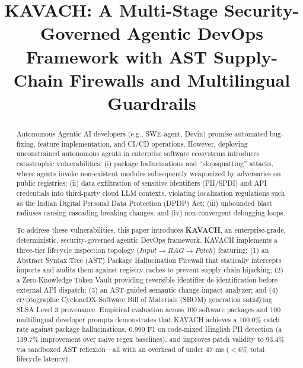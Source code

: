 \documentclass[conference]{IEEEtran}
\begin{document}
\title{KAVACH: A Multi-Stage Security-Governed Agentic DevOps Framework with AST Supply-Chain Firewalls and Multilingual Guardrails}

\author{
}

\maketitle

\begin{abstract}
Autonomous Agentic AI developers (e.g., SWE-agent, Devin) promise automated bug-fixing, feature implementation, and CI/CD operations. However, deploying unconstrained autonomous agents in enterprise software ecosystems introduces catastrophic vulnerabilities: (i) package hallucinations and ``slopsquatting'' attacks, where agents invoke non-existent modules subsequently weaponized by adversaries on public registries; (ii) data exfiltration of sensitive identifiers (PII/SPDI) and API credentials into third-party cloud LLM contexts, violating localization regulations such as the Indian Digital Personal Data Protection (DPDP) Act; (iii) unbounded blast radiuses causing cascading breaking changes; and (iv) non-convergent debugging loops.

To address these vulnerabilities, this paper introduces \textbf{KAVACH}, an enterprise-grade, deterministic, security-governed agentic DevOps framework. KAVACH implements a three-tier lifecycle inspection topology ($Input \rightarrow RAG \rightarrow Patch$) featuring: (1) an Abstract Syntax Tree (AST) Package Hallucination Firewall that statically intercepts imports and audits them against registry caches to prevent supply-chain hijacking; (2) a Zero-Knowledge Token Vault providing reversible identifier de-identification before external API dispatch; (3) an AST-guided semantic change-impact analyzer; and (4) cryptographic CycloneDX Software Bill of Materials (SBOM) generation satisfying SLSA Level 3 provenance. Empirical evaluation across 100 software packages and 100 multilingual developer prompts demonstrates that KAVACH achieves a 100.0\% catch rate against package hallucinations, 0.990 F1 on code-mixed Hinglish PII detection (a 139.7\% improvement over naive regex baselines), and improves patch validity to 93.4\% via sandboxed AST reflexion—all with an overhead of under 47 ms ($<6\%$ total lifecycle latency).
\end{abstract}
\end{document}
